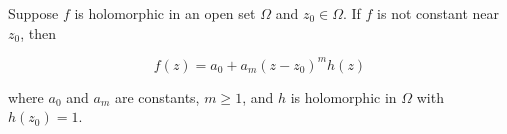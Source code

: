 Suppose $f$ is holomorphic in an open set $\Omega$ and $z_0 \in \Omega$. If $f$ is not constant near $z_0$, then

$$f(z) = a_0 + a_m(z - z_0)^m h(z)$$

where $a_0$ and $a_m$ are constants, $m \geq 1$, and $h$ is holomorphic in $\Omega$ with $h(z_0) = 1$.
